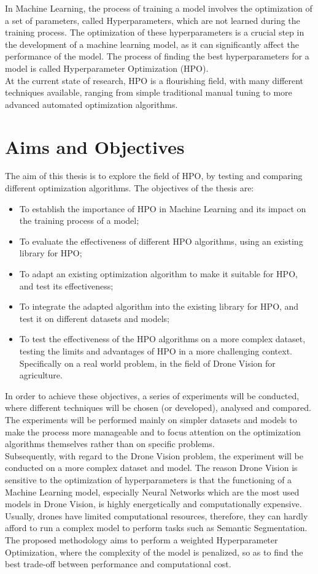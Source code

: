 In Machine Learning, the process of training a model involves the optimization of a set of parameters, called Hyperparameters, which are not learned during the training process. The optimization of these hyperparameters is a crucial step in the development of a machine learning model, as it can significantly affect the performance of the model. The process of finding the best hyperparameters for a model is called Hyperparameter Optimization (HPO).
\\[0.3cm]At the current state of research, HPO is a flourishing field, with many different techniques available, ranging from simple traditional manual tuning to more advanced automated optimization algorithms.

\section{Aims and Objectives}

The aim of this thesis is to explore the field of HPO, by testing and comparing different optimization algorithms.
The objectives of the thesis are:
\begin{itemize}[itemsep=0.1cm]
	\item To establish the importance of HPO in Machine Learning and its impact on the training process of a model;
	\item To evaluate the effectiveness of different HPO algorithms, using an existing library for HPO;
	\item To adapt an existing optimization algorithm to make it suitable for HPO, and test its effectiveness;
	\item To integrate the adapted algorithm into the existing library for HPO, and test it on different datasets and models;
	\item To test the effectiveness of the HPO algorithms on a more complex dataset, testing the limits and advantages of HPO in a more challenging context. Specifically on a real world problem, in the field of Drone Vision for agriculture.
\end{itemize}
In order to achieve these objectives, a series of experiments will be conducted, where different techniques will be chosen (or developed), analysed and compared. The experiments will be performed mainly on simpler datasets and models to make the process more manageable and to focus attention on the optimization algorithms themselves rather than on specific problems.
\\[0.3cm]Subsequently, with regard to the Drone Vision problem, the experiment will be conducted on a more complex dataset and model. The reason Drone Vision is sensitive to the optimization of hyperparameters is that the functioning of a Machine Learning model, especially Neural Networks which are the most used models in Drone Vision, is highly energetically and computationally expensive. Usually, drones have limited computational resources, therefore, they can hardly afford to run a complex model to perform tasks such as Semantic Segmentation. The proposed methodology aims to perform a weighted Hyperparameter Optimization, where the complexity of the model is penalized, so as to find the best trade-off between performance and computational cost. 

